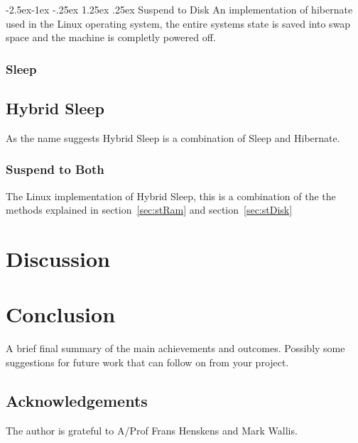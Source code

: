 \documentclass[a4,12pt]{article}
\makeatletter
\renewcommand\paragraph{\@startsection{paragraph}{4}{\z@}%
{-2.5ex\@plus -1ex \@minus -.25ex}%
{1.25ex \@plus .25ex}%
{\normalfont\normalsize\bfseries}}
\makeatother
\begin{document}
\paragraph{Suspend to Disk}\label{sec:stDisk}
An implementation of hibernate used in the Linux operating system, the entire systems state is saved into swap space and the machine is completly powered off.\citep{Wiki}
\subsubsection{Sleep}

\subsection{Hybrid Sleep}
As the name suggests Hybrid Sleep is a combination of Sleep and Hibernate.
\subsubsection{Suspend to Both}
The Linux implementation of Hybrid Sleep, this is a combination of the the methods explained in section~\ref{sec:stRam} and section~\ref{sec:stDisk}

\section{Discussion}\label{sec:discussion}
%
\section{Conclusion}
%
A brief final summary of the main achievements and outcomes. Possibly some suggestions for future work that can follow on from your project.%
%
\subsection*{Acknowledgements}
The author is grateful to A/Prof Frans Henskens and Mark Wallis.
%

\vskip 0.2in


\end{document}
